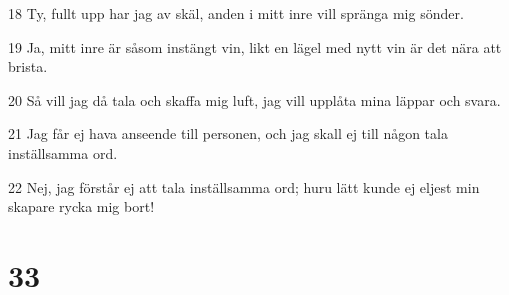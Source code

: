 \par 18 Ty, fullt upp har jag av skäl, anden i mitt inre vill spränga mig sönder.
\par 19 Ja, mitt inre är såsom instängt vin, likt en lägel med nytt vin är det nära att brista.
\par 20 Så vill jag då tala och skaffa mig luft, jag vill upplåta mina läppar och svara.
\par 21 Jag får ej hava anseende till personen, och jag skall ej till någon tala inställsamma ord.
\par 22 Nej, jag förstår ej att tala inställsamma ord; huru lätt kunde ej eljest min skapare rycka mig bort!

\chapter{33}

